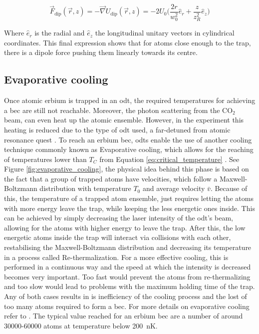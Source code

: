 \begin{equation}
	\vec{F}_{\text{dip}}(\vec{r}, z) = -\vec{\nabla}{U_{\text{dip}}(\vec{r}, z)}= -2U_0\bigg(\frac{2 r}{w_0^2}\hat{e}_r + \frac{z}{z_R^2}\hat{e}_z\bigg)
\end{equation}

Where $\hat{e}_r$ is the radial and $\hat{e}_z$ the longitudinal unitary vectors in cylindrical coordinates. This final expression shows that for atoms close enough to the trap, there is a dipole force pushing them linearly towards its centre.

\subsection{Evaporative cooling}

Once atomic erbium is trapped in an \ac{odt}, the required temperatures for achieving a \ac{bec} are still not reachable. Moreover, the photon scattering from the $\text{CO}_2$ beam, can even heat up the atomic ensemble. However, in the experiment this heating is reduced due to the type of \ac{odt} used, a far-detuned from atomic resonance \ac{quest} . To reach an erbium \ac{bec}, \aclp{odt} enable the use of another cooling technique commonly known as Evaporative cooling, which allows for the reaching of temperatures lower than $T_C$ from Equation \eqref{eq:critical_temperature} \cite{Masuhara1988}. See Figure \ref{fig:evaporative_cooling}, the physical idea behind this phase is based on the fact that a group of trapped atoms have velocities, which follow a Maxwell-Boltzmann distribution with temperature $T_0$ and average velocity $\bar{v}$. Because of this, the temperature of a trapped atom ensemble, just requires letting the atoms with more energy leave the trap, while keeping the less energetic ones inside. This can be achieved by simply decreasing the laser intensity of the \ac{odt}'s beam, allowing for the atoms with higher energy to leave the trap. After this, the low energetic atoms inside the trap will interact via collisions with each other, restabilising the Maxwell-Boltzmann distribution and decreasing its temperature in a process called Re-thermalization. For a more effective cooling, this is performed in a continuous way and the speed at which the intensity is decreased becomes very important. Too fast would prevent the atoms from re-thermalizing and too slow would lead to problems with the maximum holding time of the trap. Any of both cases results in is inefficiency of the cooling process and the lost of too many atoms required to form a \ac{bec}. For more details on evaporative cooling refer to \cite{Ulitzsch2016, Metcalf1999, Roell2016}. The typical value reached for an erbium \ac{bec} are a number of around \num{30000}-\num{60000} atoms at temperature below \SI{200}{\nano\kelvin}.


